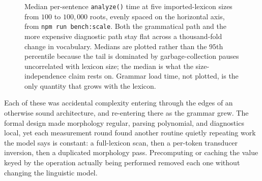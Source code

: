 \documentclass[11pt]{article}
\theoremstyle{definition}
\theoremstyle{plain}
\theoremstyle{remark}
\begin{document}
\begin{figure}[H]
\centering
{}
\caption{Median per-sentence \texttt{analyze()} time at five imported-lexicon sizes
from \(100\) to \(100{,}000\) roots, evenly spaced on the horizontal axis, from
\texttt{npm run bench:scale}. Both the grammatical path and the more expensive
diagnostic path stay flat across a thousand-fold change in vocabulary. Medians are
plotted rather than the \(95\)th percentile because the tail is dominated by
garbage-collection pauses uncorrelated with lexicon size; the median is what the
size-independence claim rests on. Grammar load time, not plotted, is the only
quantity that grows with the lexicon.}
\label{fig:scaling}
\end{figure}

Each of these was accidental complexity entering through the edges of an
otherwise sound architecture, and re-entering there as the grammar grew. The formal
design made morphology regular, parsing polynomial, and diagnostics local, yet
each measurement round found another routine quietly repeating work the model
says is constant: a full-lexicon scan, then a per-token transducer inversion,
then a duplicated morphology pass. Precomputing or caching the value keyed by
the operation actually being performed removed each one without changing the
linguistic model.
\end{document}
